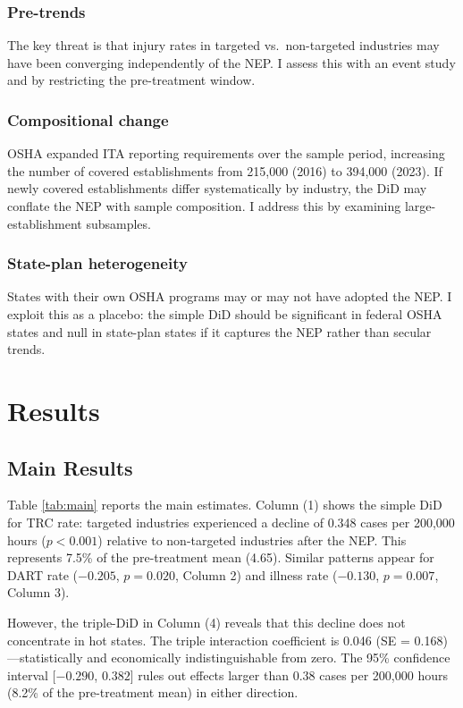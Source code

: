 \documentclass[12pt]{article}
\begin{document}
\subsubsection*{Pre-trends} The key threat is that injury rates in targeted vs.\ non-targeted industries may have been converging independently of the NEP. I assess this with an event study and by restricting the pre-treatment window.

\subsubsection*{Compositional change} OSHA expanded ITA reporting requirements over the sample period, increasing the number of covered establishments from 215,000 (2016) to 394,000 (2023). If newly covered establishments differ systematically by industry, the DiD may conflate the NEP with sample composition. I address this by examining large-establishment subsamples.

\subsubsection*{State-plan heterogeneity} States with their own OSHA programs may or may not have adopted the NEP. I exploit this as a placebo: the simple DiD should be significant in federal OSHA states and null in state-plan states if it captures the NEP rather than secular trends.


\section{Results}

\subsection{Main Results}



Table \ref{tab:main} reports the main estimates. Column (1) shows the simple DiD for TRC rate: targeted industries experienced a decline of 0.348 cases per 200,000 hours ($p < 0.001$) relative to non-targeted industries after the NEP. This represents 7.5\% of the pre-treatment mean (4.65). Similar patterns appear for DART rate ($-0.205$, $p = 0.020$, Column 2) and illness rate ($-0.130$, $p = 0.007$, Column 3).

However, the triple-DiD in Column (4) reveals that this decline does not concentrate in hot states. The triple interaction coefficient is 0.046 (SE = 0.168)---statistically and economically indistinguishable from zero. The 95\% confidence interval [$-0.290$, $0.382$] rules out effects larger than 0.38 cases per 200,000 hours (8.2\% of the pre-treatment mean) in either direction.
\end{document}

